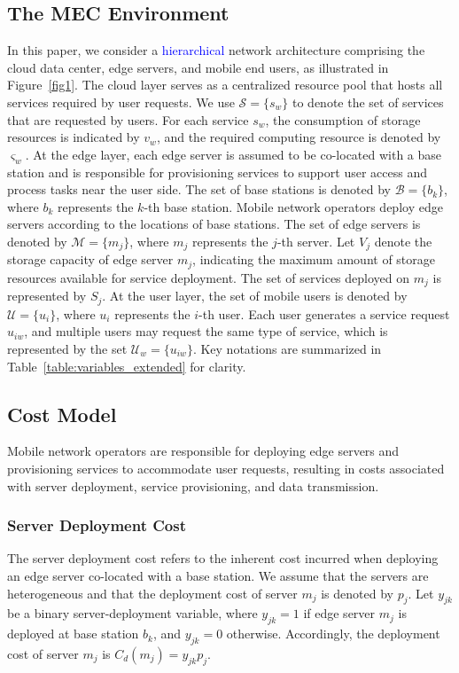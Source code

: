 \documentclass[10pt, conference, letterpaper]{IEEEtran}
\newenvironment{revision}{\begingroup\color{blue}}{\endgroup}
\newcommand{\rev}[1]{\textcolor{blue}{#1}}
\newenvironment{revision}{\begingroup}{\endgroup}
\newcommand{\rev}[1]{#1}
\begin{document}
\subsection{The MEC Environment}
In this paper, we consider a \rev{hierarchical} network architecture comprising the cloud data center, edge servers, and mobile end users, as illustrated in Figure~\ref{fig1}. The cloud layer serves as a centralized resource pool that hosts all services required by user requests. We use $\mathcal{S} = \{s_w\}$ to denote the set of services that are requested by users. For each service $s_w$, the consumption of storage resources is indicated by $v_{w}$, and the required computing resource is denoted by $\varsigma_{w}$. At the edge layer, each edge server is assumed to be co-located with a base station and is responsible for provisioning services to support user access and process tasks near the user side. The set of base stations is denoted by $\mathcal{B} = \{b_k\}$, where $b_k$ represents the $k$-th base station. Mobile network operators deploy edge servers according to the locations of base stations. The set of edge servers is denoted by $\mathcal{M} = \{m_j\}$, where $m_j$ represents the $j$-th server. Let $V_j$ denote the storage capacity of edge server $m_j$, indicating the maximum amount of storage resources available for service deployment. The set of services deployed on $m_j$ is represented by $S_j$. At the user layer, the set of mobile users is denoted by $\mathcal{U} = \{u_i\}$, where $u_i$ represents the $i$-th user. Each user generates a service request $u_{iw}$, and multiple users may request the same type of service, which is represented by the set $\mathcal{U}_{w}=\{u_{iw}\}$. Key notations are summarized in Table~\ref{table:variables_extended} for clarity. 

\subsection{Cost Model}
Mobile network operators are responsible for deploying edge servers and provisioning services to accommodate user requests, resulting in costs associated with server deployment, service provisioning, and data transmission. 
\subsubsection{Server Deployment Cost} 
\begin{revision}
The server deployment cost refers to the inherent cost incurred when deploying an edge server co-located with a base station. We assume that the servers are heterogeneous and that the deployment cost of server $m_j$ is denoted by $p_j$. Let $y_{jk}$ be a binary server-deployment variable, where $y_{jk}=1$ if edge server $m_j$ is deployed at base station $b_k$, and $y_{jk}=0$ otherwise. Accordingly, the deployment cost of server $m_j$ is $C_{d}(m_j)=y_{jk}p_j$.
\end{revision}
\end{document}
